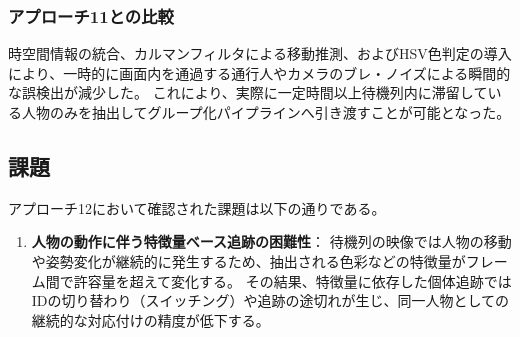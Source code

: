 \subsubsection{アプローチ11との比較}
時空間情報の統合、カルマンフィルタによる移動推測、およびHSV色判定の導入により、一時的に画面内を通過する通行人やカメラのブレ・ノイズによる瞬間的な誤検出が減少した。
これにより、実際に一定時間以上待機列内に滞留している人物のみを抽出してグループ化パイプラインへ引き渡すことが可能となった。

\subsection{課題}
アプローチ12において確認された課題は以下の通りである。

\begin{enumerate}
    \item \textbf{人物の動作に伴う特徴量ベース追跡の困難性}：
    待機列の映像では人物の移動や姿勢変化が継続的に発生するため、抽出される色彩などの特徴量がフレーム間で許容量を超えて変化する。
    その結果、特徴量に依存した個体追跡ではIDの切り替わり（スイッチング）や追跡の途切れが生じ、同一人物としての継続的な対応付けの精度が低下する。
\end{enumerate}

\clearpage
